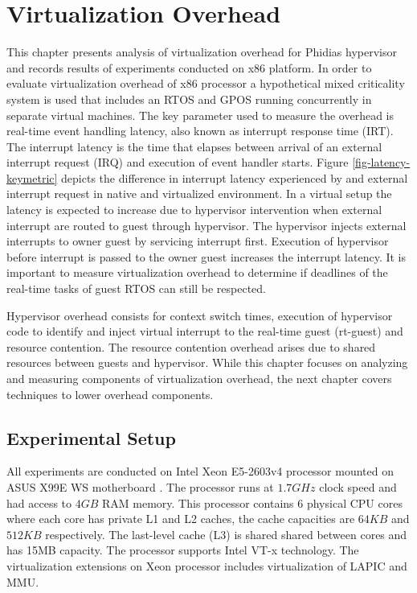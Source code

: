 \chapter{Virtualization Overhead\label{chap3}}

This chapter presents analysis of virtualization overhead for Phidias hypervisor and records 
results of experiments conducted on x86 platform. 
In order to evaluate virtualization overhead of x86 processor a hypothetical mixed criticality system is used
that includes an RTOS and GPOS running concurrently in separate virtual machines.
The key parameter used to measure the overhead is real-time event handling latency, also known as 
interrupt response time (IRT).
The interrupt latency is the time that elapses between arrival of an external interrupt request (IRQ) and execution of event handler starts.
Figure \ref{fig-latency-keymetric} depicts the difference in interrupt latency experienced by and external interrupt request in native and
virtualized environment.
In a virtual setup the latency is expected to increase due to hypervisor intervention when external interrupt are routed to guest through hypervisor.
The hypervisor injects external interrupts to owner guest by servicing interrupt first. Execution of hypervisor before interrupt is passed to 
the owner guest increases the interrupt latency.
It is important to measure virtualization overhead to determine if deadlines of the real-time tasks of guest RTOS can still be respected.



Hypervisor overhead consists for context switch times, execution of hypervisor code to identify and inject virtual interrupt to the real-time guest (rt-guest) and
resource contention. The resource contention overhead arises due to shared resources between guests and hypervisor.
While this chapter focuses on analyzing and measuring components of virtualization overhead, the next chapter covers techniques to lower overhead components.

\section{Experimental Setup} 
All experiments are conducted on Intel Xeon E5-2603v4 processor \cite{intel-ark-xeon} mounted on ASUS X99E WS motherboard \cite{asus-x99e}. 
The processor runs at $1.7GHz$ clock speed and had access to $4GB$ RAM memory.
This processor contains $6$ physical CPU cores where each core has private L1 and L2 caches, the cache capacities are $64KB$ and $512KB$ respectively.
The last-level cache (L3) is shared shared between cores and has 15MB capacity. 
The processor supports Intel VT-x technology. The virtualization extensions on Xeon processor includes virtualization of LAPIC and MMU.

